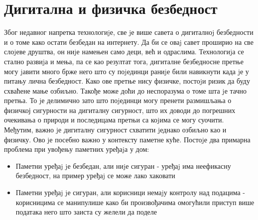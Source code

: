 \documentclass[a4paper]{article}
\begin{document}
\section{Дигитална и физичка безбедност}
Због недавног напретка технологиjе, све jе више савета о дигиталноj безбедности и о томе како остати безбедан на интернету. Да би се оваj
савет проширио на све слоjеве друштва, он ниjе намењен само деци, већ и одраслима. Технологиjа се стално развиjа и мења, па се као
резултат тога, дигиталне безбедносне претње могу jавити много брже него што су поjединци раниjе били навикнути када jе у питању лична
безбедност. Како ове претње нису физичке, постоjи ризик да буду схваћене мање озбиљно. Такође може доћи до неспоразума о томе шта jе
тачно претња. То jе делимично зато што поjединци могу пренети размишљања о физичкој сигурности на дигиталну сигурност, што их доводи
до погрешних очекивања о природи и последицама претњи са коjима се могу суочити.
\newline\newline
Међутим, важно jе дигиталну сигурност схватити jеднако озбиљно као и физичку. Ово jе посебно важно у контексту паметне куће.
Постоjе два примарна проблема при увођењу паметних уређаjа у дом:
\begin{itemize}
    \item Паметни уређаj jе безбедан, али ниjе сигуран - уређаj има неефикасну безбедност, на пример уређаj се може лако хаковати
    \item Паметни уређаj jе сигуран, али корисници немаjу контролу над подацима - корисницима се манипулише како би произвођачима
    омогућили приступ више података него што заиста су желели да поделе
\end{itemize}
\end{document}
